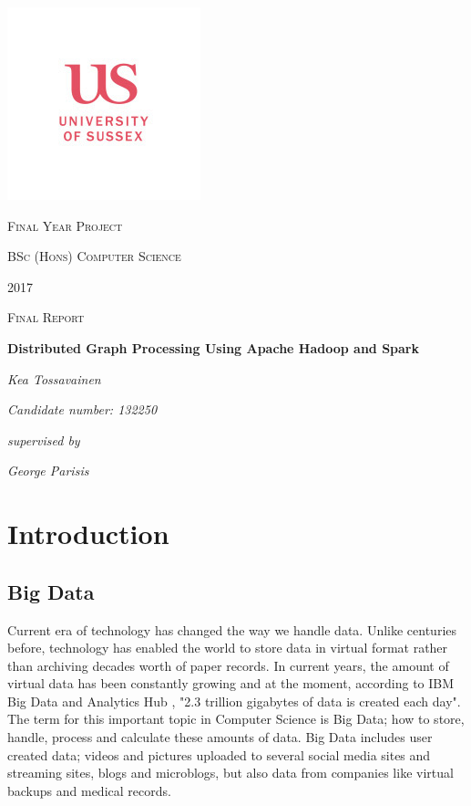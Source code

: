 \documentclass{article}
\theoremstyle{definition}
\begin{document}



\begin{titlepage}
	\centering
	\includegraphics{sussex} \par
	{\scshape\Large Final Year Project \par}
	{\Large\scshape BSc (Hons) Computer Science\par}
	{\Large\scshape 2017\par}
	{\scshape\Large Final Report\par}
	\vspace{1cm}
	{\huge\bfseries Distributed Graph Processing Using Apache Hadoop and Spark\par}
	\vspace{1cm}
	{\Large\itshape Kea Tossavainen \par}
	{\Large\itshape Candidate number: 132250\par}
	\vfill
	{\Large\itshape supervised by\par}
	{\Large\itshape George Parisis\par}

	\vfill
\end{titlepage}


\tableofcontents

\newpage
\section{Introduction}

\subsection{Big Data}
Current era of technology has changed the way we handle data. Unlike centuries before, technology has enabled the world to store data in virtual format rather than archiving decades worth of paper records. In current years, the amount of virtual data has been constantly growing and at the moment, according to IBM Big Data and Analytics Hub \cite{ibm}, "2.3 trillion gigabytes of data is created each day". The term for this important topic in Computer Science is Big Data; how to store, handle, process and calculate these amounts of data. Big Data includes user created data; videos and pictures uploaded to several social media sites and streaming sites, blogs and microblogs, but also data from companies like virtual backups and medical records. \\
\end{document}
